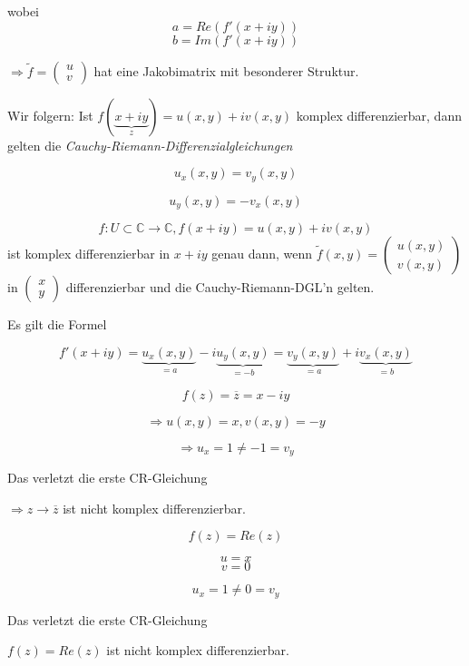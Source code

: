 \documentclass[10pt,a4paper]{article}
\begin{document}
wobei $$a=Re(f'(x+iy))$$ $$b=Im(f'(x+iy))$$

$\Rightarrow \tilde{f}= \begin{pmatrix}
u \\ v
\end{pmatrix} $ hat eine Jakobimatrix mit besonderer Struktur.


Wir folgern: Ist $f(\underbrace{x+iy}_{z})= u(x,y)+iv(x,y)$ komplex differenzierbar, dann gelten die \emph{Cauchy-Riemann-Differenzialgleichungen}

\begin{defi}

$$u_x(x,y)=v_y(x,y)$$

$$u_y(x,y)=-v_x(x,y)$$

\end{defi}

\begin{satz} 


$$f: U \subset \mathbb{C} \rightarrow \mathbb{C} , f(x+iy)=u(x,y)+iv(x,y)$$ ist komplex differenzierbar in $x+iy$ genau dann, wenn $\tilde{f}(x,y)= \begin{pmatrix}
u(x,y) \\v(x,y)
\end{pmatrix} $ in $ \begin{pmatrix}
x \\ y
\end{pmatrix} $ differenzierbar und die Cauchy-Riemann-DGL'n gelten.

Es gilt die Formel

$$f'(x+iy)=\underbrace{u_x(x,y)}_{=a}-i\underbrace{u_y(x,y)}_{=-b}=\underbrace{v_y (x,y)}_{=a} + i\underbrace{v_x(x,y)}_{=b}$$


\end{satz}


\begin{bsp}[Komplexe Diff'barkeit von $f(z)=\overline{z}$ mit CR prüfen]

$$f(z)=\overline{z}=x-iy$$

$$\Rightarrow u(x,y)=x, v(x,y)=-y$$

$$\Rightarrow u_x=1 \not= -1 = v_y$$

Das verletzt die erste CR-Gleichung

$\Rightarrow z \rightarrow \overline{z}$ ist nicht komplex differenzierbar.


\end{bsp}


\begin{bsp}[Komplexe Diff'barkeit von $f(z)=Re(z)$ mit CR prüfen]

$$f(z)=Re(z)$$

$$u=x$$
$$v=0$$

$$u_x=1 \not= 0 = v_y$$

Das verletzt die erste CR-Gleichung

$f(z)=Re(z)$ ist nicht komplex differenzierbar.

\end{bsp}
\end{document}
